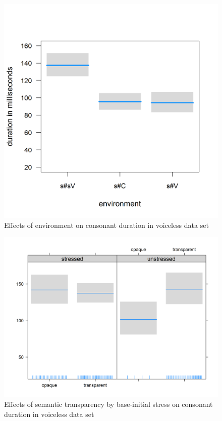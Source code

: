 \begin{figure} [t!]
	\centering
	\includegraphics [scale=0.4]{images/Corpus/disModelWithoutVoicedSoundsEnvironment.png}
	\caption{ Effects of environment on consonant duration in voiceless data set}
	\label{fig:corpus main effect 1 dis without voiced items}
		\vspace*{0.8cm}
\end{figure}


\begin{figure} [b!]
	\centering

	\includegraphics [scale=0.5]{images/Corpus/disModelWithoutVoicedSoundsSemanticTransTypeByStress.png}
	\caption{Effects of semantic transparency by  base-initial stress on consonant duration in voiceless data set}
	\label{fig:corpus main effect 2 dis without voiced items}
\end{figure}






